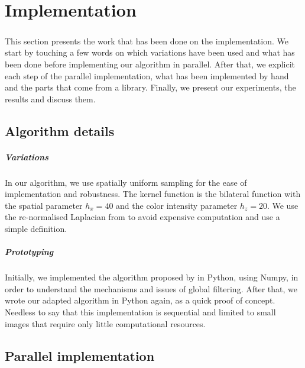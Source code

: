 \chapter{Implementation}

\paragraph{}
This section presents the work that has been done on the implementation.
We start by touching a few words on which variations have been used and what has been done before implementing our algorithm in parallel.
After that, we explicit each step of the parallel implementation, what has been implemented by hand and the parts that come from a library.
Finally, we present our experiments, the results and discuss them.

\section{Algorithm details}

\paragraph{Variations}
In our algorithm, we use spatially uniform sampling for the ease of implementation and robustness.
The kernel function is the bilateral function with the spatial parameter \(h_x = 40\) and the color intensity parameter \(h_z = 20\).
We use the re-normalised Laplacian from \cite{milanfar_new_2016} to avoid expensive computation and use a simple definition.

\paragraph{Prototyping}
Initially, we implemented the algorithm proposed by \cite{glide_2014} in Python, using Numpy, in order to understand the mechanisms and issues of global filtering.
After that, we wrote our adapted algorithm in Python again, as a quick proof of concept.
Needless to say that this implementation is sequential and limited to small images that require only little computational resources.

\section{Parallel implementation}


